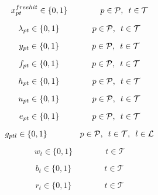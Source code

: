 \begin{equation} \label{eq:free_hit_bin_x}
    x^{free hit}_{pt} \in \{0,1\} \qquad\qquad p \in \mathcal{P}, \enskip t \in \mathcal{T}
\end{equation}

\begin{equation} \label{eq:auxiliary_variable_binary}
    \lambda_{pt} \in \{0,1\} \qquad\qquad p \in \mathcal{P}, \enskip t \in \mathcal{T}
\end{equation}

\begin{equation} \label{eq:bin_y}
    y_{pt} \in \{0,1\} \qquad\qquad p \in \mathcal{P}, \enskip t \in \mathcal{T}
\end{equation}

\begin{equation} \label{eq:bin_f}
    f_{pt} \in \{0,1\} \qquad\qquad p \in \mathcal{P}, \enskip t \in \mathcal{T}
\end{equation}

\begin{equation} \label{eq:bin_h}
    h_{pt} \in \{0,1\} \qquad\qquad p \in \mathcal{P}, \enskip t \in \mathcal{T}
\end{equation}
 
\begin{equation} \label{eq:bin_u}
    u_{pt} \in \{0,1\} \qquad\qquad p \in \mathcal{P}, \enskip t \in \mathcal{T} 
\end{equation}

\begin{equation} \label{eq:nonn_e}
    e_{pt} \in \{0,1\} \qquad\qquad p \in \mathcal{P}, \enskip t \in \mathcal{T} 
\end{equation}

\begin{equation} \label{eq:binf_g}
    g_{ptl} \in \{0,1\} \qquad\qquad p \in \mathcal{P}, \enskip t \in \mathcal{T},\enskip l \in \mathcal{L}
\end{equation}

\begin{equation} \label{eq:wildcard_bin_w}
    w_{t} \in \{0,1\} \qquad\qquad  t \in \mathcal{T}
\end{equation}

\begin{equation} \label{eq:bench_boost_bin_b}
    b_{t} \in \{0,1\} \qquad\qquad  t \in \mathcal{T}
\end{equation}

\begin{equation} \label{eq:free_hit_bin_r}
    r_{t} \in \{0,1\} \qquad\qquad  t \in \mathcal{T}
\end{equation}

